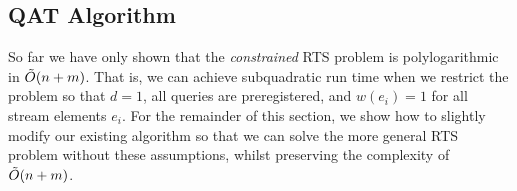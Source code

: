 \subsection{QAT Algorithm}

So far we have only shown that the \textit{constrained} RTS problem is polylogarithmic in $\Tilde{O}(n+m)$. That is, we can achieve subquadratic run time when we restrict the problem so that $d=1$, all queries are preregistered, and $w(e_i) = 1$ for all stream elements $e_i$. For the remainder of this section, we show how to slightly modify our existing algorithm so that we can solve the more general RTS problem without these assumptions, whilst preserving the complexity of $\Tilde{O}(n+m)$.